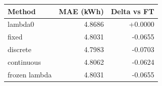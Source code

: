 \begin{tabular}{lrr}
Method & MAE (kWh) & Delta vs FT \\
\hline
lambda0 & 4.8686 & +0.0000 \\
fixed & 4.8031 & -0.0655 \\
discrete & 4.7983 & -0.0703 \\
continuous & 4.8062 & -0.0624 \\
frozen lambda & 4.8031 & -0.0655 \\
\end{tabular}
